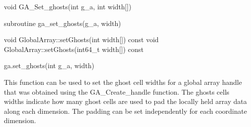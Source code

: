 \documentclass[10pt]{article}
\begin{document}

\begin{capi}
\begin{ccode}
void GA_Set_ghosts(int g_a, int width[])
\end{ccode}
\begin{funcargs}
\end{funcargs}
\end{capi}

\begin{fapi}
\begin{fcode}
subroutine ga_set_ghosts(g_a, width)
\end{fcode}
\begin{funcargs}
\end{funcargs}
\end{fapi}

\begin{cxxapi}
\begin{cxxcode}
void GlobalArray::setGhosts(int width[]) const
void GlobalArray::setGhosts(int64_t width[]) const
\end{cxxcode}
\begin{funcargs}
\end{funcargs}
\end{cxxapi}

\begin{pyapi}
\begin{pycode}
ga.set_ghosts(int g_a, width)
\end{pycode}
\begin{funcargs}
\end{funcargs}
\end{pyapi}

\gcoll

\begin{desc}

This function can be used to set the ghost cell widths for a global array
handle that was obtained using the GA_Create_handle function.  The ghosts cells
widths indicate how many ghost cells are used to pad the locally held array
data along each dimension. The padding can be set independently for each
coordinate dimension.

\end{desc}
\end{document}
